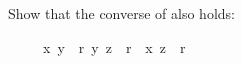 \begin{isabellebody}
\begin{isamarkuptext}
\begin{exercise}
Show that the converse of  also holds:
\begin{isabelle}%
\ \ \ \ \ {\isasymlbrakk}{\isacharparenleft}x{\isacharcomma}\ y{\isacharparenright}\ {\isasymin}\ r{\isacharasterisk}{\isacharsemicolon}\ {\isacharparenleft}y{\isacharcomma}\ z{\isacharparenright}\ {\isasymin}\ r{\isasymrbrakk}\ {\isasymLongrightarrow}\ {\isacharparenleft}x{\isacharcomma}\ z{\isacharparenright}\ {\isasymin}\ r{\isacharasterisk}%
\end{isabelle}
\end{exercise}%
\end{isamarkuptext}%
\end{isabellebody}%
